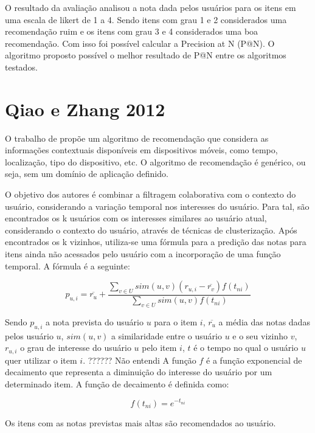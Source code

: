 O resultado da avaliação analisou a nota dada pelos usuários para os itens em uma escala de likert de 1 a 4. Sendo itens
com grau 1 e 2 considerados uma recomendação ruim e os itens com grau 3 e 4 considerados uma boa recomendação. Com isso
foi possível calcular a Precision at N (P@N). O algoritmo proposto possível o melhor resultado de P@N entre os
algoritmos testados.

\section{Qiao e Zhang 2012}

O trabalho de  propõe um algoritmo de recomendação que considera as informações
contextuais disponíveis em dispositivos móveis, como tempo, localização, tipo do dispositivo, etc. O algoritmo de
recomendação é genérico, ou seja, sem um domínio de aplicação definido.

O objetivo dos autores é combinar a filtragem colaborativa com o contexto do usuário, considerando a variação temporal
nos interesses do usuário. Para tal, são encontrados os k usuários com os interesses similares ao usuário atual,
considerando o contexto do usuário, através de técnicas de clusterização. Após encontrados os k vizinhos, utiliza-se
uma fórmula para a predição das notas para itens ainda não acessados pelo usuário com a incorporação de uma função
temporal. A fórmula é a seguinte:

\begin{equation}
  p_{u,i} = \overline{r_u} + \frac{\sum_{v \in U}{sim(u, v)(r_{u,i} - \overline{r_v})f(t_{ni})}}{\sum_{v \in U}{sim(u, v)f(t_{ni})}}
  \label{eq:qiao-predicao}
\end{equation}

Sendo $p_{u,i}$ a nota prevista do usuário $u$ para o item $i$, $\overline{r_u}$ a média das notas dadas pelos usuário
$u$, $sim(u, v)$ a similaridade entre o usuário $u$ e o seu vizinho $v$, $r_{u,i}$ o grau de interesse do usuário $u$
pelo item $i$, $t$ é o tempo no qual o usuário $u$ quer utilizar o item $i$. ?????? Não entendi A função $f$ é a função
exponencial de decaimento que representa a diminuição do interesse do usuário por um determinado item. A função de
decaimento é definida como:

\begin{equation}
  f(t_{ni}) = e^{-t_{ni}}
  \label{eq:qiao-funcao-decaimento}
\end{equation}

Os itens com as notas previstas mais altas são recomendados ao usuário.

